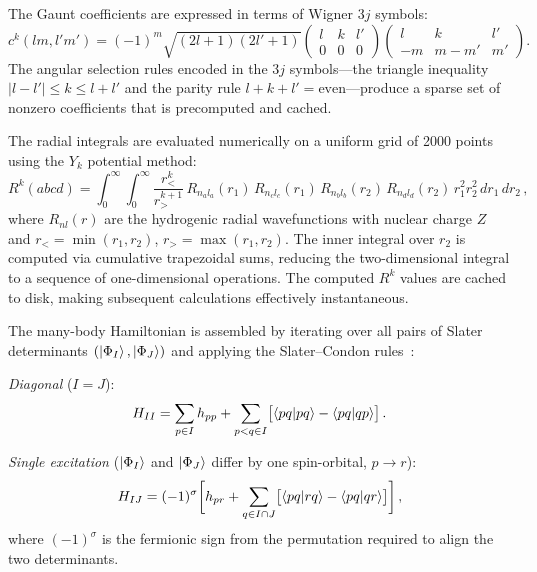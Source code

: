 \documentclass[aps,pra,twocolumn,superscriptaddress,longbibliography,floatfix]{revtex4-2}
\begin{document}
The Gaunt coefficients are expressed in terms of Wigner $3j$ symbols:
\begin{equation}
c^k(l m, l' m') = (-1)^m \sqrt{(2l+1)(2l'+1)}
\begin{pmatrix} l & k & l' \\ 0 & 0 & 0 \end{pmatrix}
\begin{pmatrix} l & k & l' \\ -m & m-m' & m' \end{pmatrix}.
\label{eq:gaunt}
\end{equation}
The angular selection rules encoded in the $3j$ symbols---the
triangle inequality $|l - l'| \leq k \leq l + l'$ and the parity
rule $l + k + l' = \text{even}$---produce a sparse set of nonzero
coefficients that is precomputed and cached.

The radial integrals are evaluated numerically on a uniform grid
of 2000 points using the $Y_k$ potential method:
\begin{equation}
R^k(abcd) = \int_0^{\infty} \int_0^{\infty}
\frac{r_<^k}{r_>^{k+1}}\,
R_{n_a l_a}(r_1)\, R_{n_c l_c}(r_1)\,
R_{n_b l_b}(r_2)\, R_{n_d l_d}(r_2)\,
r_1^2 r_2^2\, dr_1\, dr_2\,,
\label{eq:rk}
\end{equation}
where $R_{nl}(r)$ are the hydrogenic radial wavefunctions with
nuclear charge $Z$ and $r_< = \min(r_1, r_2)$,
$r_> = \max(r_1, r_2)$.
The inner integral over $r_2$ is computed via cumulative trapezoidal
sums, reducing the two-dimensional integral to a sequence of
one-dimensional operations.
The computed $R^k$ values are cached to disk, making subsequent
calculations effectively instantaneous.

The many-body Hamiltonian is assembled by iterating over all pairs
of Slater determinants $(\ket{\Phi_I}, \ket{\Phi_J})$ and applying
the Slater--Condon rules~\cite{Szabo1996}:

\emph{Diagonal} ($I = J$):
\begin{equation}
H_{II} = \sum_{p \in I} h_{pp}
+ \sum_{p < q \in I} \bigl[\braket{pq|pq} - \braket{pq|qp}\bigr]\,.
\label{eq:sc_diag}
\end{equation}

\emph{Single excitation} ($\ket{\Phi_I}$ and $\ket{\Phi_J}$ differ
by one spin-orbital, $p \to r$):
\begin{equation}
H_{IJ} = (-1)^{\sigma} \biggl[ h_{pr}
+ \sum_{q \in I \cap J} \bigl[\braket{pq|rq} - \braket{pq|qr}\bigr]
\biggr]\,,
\label{eq:sc_single}
\end{equation}
where $(-1)^{\sigma}$ is the fermionic sign from the permutation
required to align the two determinants.
\end{document}
